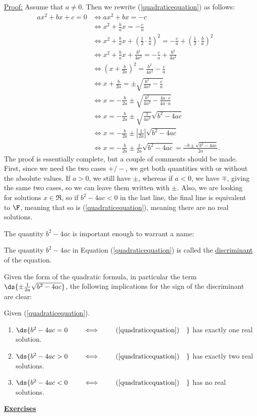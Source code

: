 \underline{Proof:} Assume that $a\ne0$.\footnotemark
{} Then we rewrite (\ref{quadraticequation})
as follows:
\begin{align*}
ax^2+bx+c=0&\iff ax^2+bx=-c\\
&\iff x^2+\frac{b}ax=-\frac{c}a\\
&\iff x^2+\frac{b}ax+\left(\frac12\cdot\frac{b}a\right)^2
	=-\frac{c}a+\left(\frac12\cdot\frac{b}a\right)^2\\
&\iff x^2+\frac{b}ax+\frac{b^2}{4a^2}=-\frac{c}a+\frac{b^2}{4a^2}\\
&\iff \left(x+\frac{b}{2a}\right)^2=\frac{b^2}{4a^2}-\frac{c}a\\
&\iff x+\frac{b}{2a}=\pm\sqrt{\frac{b^2}{4a^2}-\frac{c}a}\\
&\iff x=-\frac{b}{2a} \pm\sqrt{\frac{b^2}{4a^2}-\frac{4a\cdot c}{4a\cdot a}}\\
&\iff x=-\frac{b}{2a}\pm\sqrt{\frac1{4a^2}}\sqrt{b^2-4ac}\\ 
&\iff x=-\frac{b}{2a}\pm\left|\frac1{2a}\right|\sqrt{b^2-4ac}\\
&\iff x=-\frac{b}{2a}\pm\frac1{2a}\sqrt{b^2-4ac}
=\frac{-b\pm\sqrt{b^2-4ac}}{2a}. 
\end{align*} 
The proof is essentially complete, but a couple of comments should be made.
First, since we need the two cases $+/-$, we get both quantities with
or without the absolute values.  If $a>0$, we still have $\pm$, whereas
if $a<0$, we have $\mp$, giving the same two cases, so we can leave 
them written with $\pm$.  Also, we are looking for solutions $x\in\Re$,
so if $b^2-4ac<0$ in the last line, the final line is equivalent to
$\F$, meaning that so is (\ref{quadraticequation}), meaning
there are no real solutions.
  
The quantity $b^2-4ac$ is important enough to warrant a name:
\begin{definition}The quantity $b^2-4ac$ in Equation
{\rm (\ref{quadraticequation})}
is called the \underline{discriminant} of the equation. 
\end{definition}
Given the form of the quadratic formula, in particular
the term $\ds{\pm\frac{1}{2a}\sqrt{b^2-4ac}}$, the following 
implications for the sign of the discriminant are clear:
\begin{theorem}
Given {\rm (\ref{quadraticequation})}.
\begin{enumerate}
\item $\ds{b^2-4ac=0\qquad\iff\qquad(\ref{quadraticequation})\quad}$
has exactly one real solution.
\item $\ds{b^2-4ac>0\qquad\iff\qquad(\ref{quadraticequation})\quad}$
has exactly two real solutions.
\item $\ds{b^2-4ac<0\qquad\iff\qquad(\ref{quadraticequation})\quad}$
has no real solutions.
\end{enumerate} 
\end{theorem}
\begin{center}\underline{\Large{\bf Exercises}}\end{center}
\bigskip

